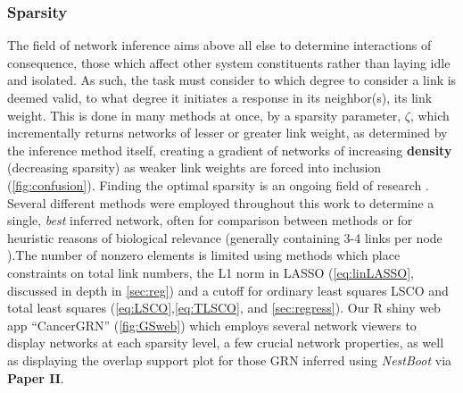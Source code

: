 \subsubsection{Sparsity}
\label{sec:spar}
The field of network inference aims above all else to determine interactions of consequence, those which affect other system constituents rather than laying idle and isolated. As such, the task must consider to which degree to consider a link is deemed valid, to what degree it initiates a response in its neighbor(s), \ie its link weight. This is done in many methods at once, by a sparsity parameter, $\zeta$, which incrementally returns networks of lesser or greater link weight, as determined by the inference method itself, creating a gradient of networks of increasing \textbf{density} (decreasing sparsity) as weaker link weights are forced into inclusion (\cref{fig:confusion}). Finding the optimal sparsity is an ongoing field of research \citep{tjarnberg2013optimal}. Several different methods were employed throughout this work to determine a single, \emph{best} inferred network, often for comparison between methods or for heuristic reasons of biological relevance (\ie generally containing 3-4 links per node \citep{tjarnberg2013optimal}).The number of nonzero elements is limited using methods which place constraints on total link numbers, \eg the L1 norm in LASSO (\cref{eq:linLASSO}, discussed in depth in \cref{sec:reg}) and a cutoff for ordinary least squares LSCO and total least squares (\cref{eq:LSCO},\cref{eq:TLSCO}, and \cref{sec:regress}). Our R shiny web app ``CancerGRN'' (\cref{fig:GSweb}) which employs several network viewers to display networks at each sparsity level, a few crucial network properties, as well as displaying the overlap support plot for those GRN inferred using \emph{NestBoot} via \textbf{Paper II}.



